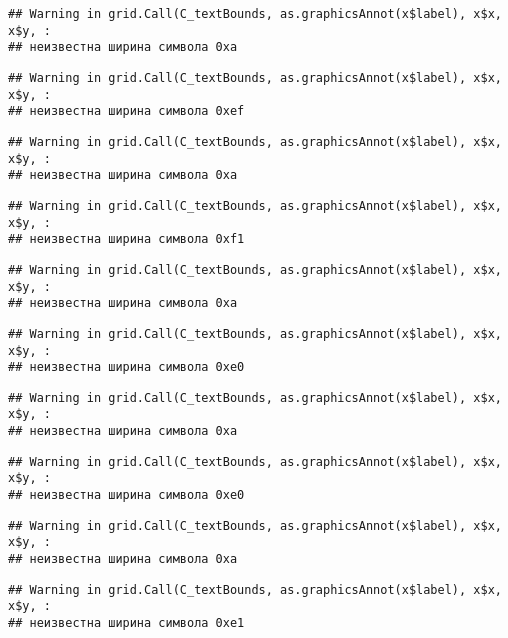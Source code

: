 \documentclass[
]{article}
\begin{document}
\begin{verbatim}
## Warning in grid.Call(C_textBounds, as.graphicsAnnot(x$label), x$x, x$y, :
## неизвестна ширина символа 0xa
\end{verbatim}

\begin{verbatim}
## Warning in grid.Call(C_textBounds, as.graphicsAnnot(x$label), x$x, x$y, :
## неизвестна ширина символа 0xef
\end{verbatim}

\begin{verbatim}
## Warning in grid.Call(C_textBounds, as.graphicsAnnot(x$label), x$x, x$y, :
## неизвестна ширина символа 0xa
\end{verbatim}

\begin{verbatim}
## Warning in grid.Call(C_textBounds, as.graphicsAnnot(x$label), x$x, x$y, :
## неизвестна ширина символа 0xf1
\end{verbatim}

\begin{verbatim}
## Warning in grid.Call(C_textBounds, as.graphicsAnnot(x$label), x$x, x$y, :
## неизвестна ширина символа 0xa
\end{verbatim}

\begin{verbatim}
## Warning in grid.Call(C_textBounds, as.graphicsAnnot(x$label), x$x, x$y, :
## неизвестна ширина символа 0xe0
\end{verbatim}

\begin{verbatim}
## Warning in grid.Call(C_textBounds, as.graphicsAnnot(x$label), x$x, x$y, :
## неизвестна ширина символа 0xa
\end{verbatim}

\begin{verbatim}
## Warning in grid.Call(C_textBounds, as.graphicsAnnot(x$label), x$x, x$y, :
## неизвестна ширина символа 0xe0
\end{verbatim}

\begin{verbatim}
## Warning in grid.Call(C_textBounds, as.graphicsAnnot(x$label), x$x, x$y, :
## неизвестна ширина символа 0xa
\end{verbatim}

\begin{verbatim}
## Warning in grid.Call(C_textBounds, as.graphicsAnnot(x$label), x$x, x$y, :
## неизвестна ширина символа 0xe1
\end{verbatim}
\end{document}
